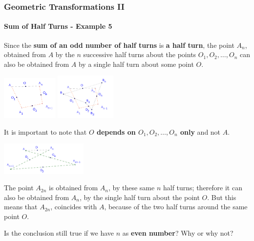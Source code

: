 \documentclass[8pt,xcolor=table,dvipsnames]{beamer}
\begin{document}
\begin{frame}[t]
    \frametitle{Geometric Transformations II}
    \framesubtitle{Sum of Half Turns - Example 5}
    Since the \textbf{sum of an odd number of half turns} is \textbf{a half turn}, the point $A_n$, obtained from $A$ by the $n$
    successive half turns about the points $O_1, O_2, \ldots, O_{n}$ can also be obtained from $A$ by a single half turn about some point $O$.
    \begin{center}
        \includegraphics[width=2.8cm]{./svg/pdf/translation-2b.pdf}
        \qquad \qquad
        \includegraphics[width=3cm]{./svg/pdf/translation-2c.pdf}
    \end{center}
    It is important to note that \textbf{$O$ depends on $O_1, O_2, \ldots, O_{n}$ only} and not $A$.
    \begin{center}
        \includegraphics[width=4.3cm]{./svg/pdf/translation-2d.pdf}
    \end{center}
    The point $A_{2n}$ is obtained from $A_n$, by these same $n$ half turns;
    therefore it can also be obtained from $A_n$, by the single half turn about the point $O$.
    But this means that $A_{2n}$, coincides with $A$, because of the two half turns around the same point $O$.
    
    Is the conclusion still true if we have $n$ as \textbf{even number}? Why or why not?
\end{frame}
\end{document}
